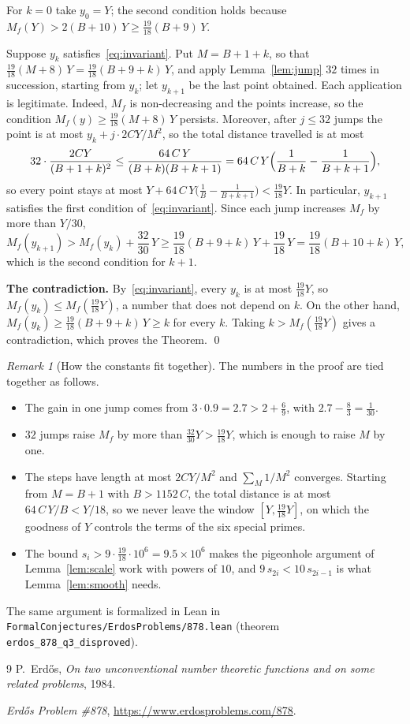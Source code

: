 \documentclass[11pt,a4paper]{amsart}
\theoremstyle{remark}
\newtheorem*{remark}{Remark}
\begin{document}
For $k = 0$ take $y_0 = Y$; the second condition holds because $M_f(Y) > 2(B + 10)\, Y \ge \frac{19}{18}(B + 9)\, Y$.

Suppose $y_k$ satisfies~\eqref{eq:invariant}. Put $M = B + 1 + k$, so that $\frac{19}{18}(M + 8)\, Y = \frac{19}{18}(B + 9 + k)\, Y$, and apply Lemma~\ref{lem:jump} $32$ times in succession, starting from $y_k$; let $y_{k+1}$ be the last point obtained. Each application is legitimate. Indeed, $M_f$ is non-decreasing and the points increase, so the condition $M_f(y) \ge \frac{19}{18}(M + 8)\, Y$ persists. Moreover, after $j \le 32$ jumps the point is at most $y_k + j \cdot 2CY/M^2$, so the total distance travelled is at most
\[
32 \cdot \frac{2 C Y}{(B + 1 + k)^2} \le \frac{64\, C\, Y}{(B + k)(B + k + 1)} = 64\, C\, Y \Bigl(\frac{1}{B + k} - \frac{1}{B + k + 1}\Bigr),
\]
so every point stays at most $Y + 64\, C\, Y \bigl(\frac{1}{B} - \frac{1}{B + k + 1}\bigr) < \frac{19}{18} Y$. In particular, $y_{k+1}$ satisfies the first condition of~\eqref{eq:invariant}. Since each jump increases $M_f$ by more than $Y/30$,
\[
M_f(y_{k + 1}) > M_f(y_k) + \frac{32}{30}\, Y \ge \frac{19}{18} (B + 9 + k)\, Y + \frac{19}{18}\, Y = \frac{19}{18} (B + 10 + k)\, Y,
\]
which is the second condition for $k + 1$.

\medskip
\noindent\textbf{The contradiction.} By~\eqref{eq:invariant}, every $y_k$ is at most $\frac{19}{18} Y$, so $M_f(y_k) \le M_f(\frac{19}{18} Y)$, a number that does not depend on $k$. On the other hand, $M_f(y_k) \ge \frac{19}{18}(B + 9 + k)\, Y \ge k$ for every $k$. Taking $k > M_f(\frac{19}{18} Y)$ gives a contradiction, which proves the Theorem. \qed

\begin{remark}[How the constants fit together]
The numbers in the proof are tied together as follows.
\begin{itemize}
\item The gain in one jump comes from $3 \cdot 0.9 = 2.7 > 2 + \frac{6}{9}$, with $2.7 - \frac{8}{3} = \frac{1}{30}$.
\item $32$ jumps raise $M_f$ by more than $\frac{32}{30} Y > \frac{19}{18} Y$, which is enough to raise $M$ by one.
\item The steps have length at most $2CY/M^2$ and $\sum_M 1/M^2$ converges. Starting from $M = B + 1$ with $B > 1152\, C$, the total distance is at most $64\, C\, Y / B < Y/18$, so we never leave the window $[Y, \frac{19}{18} Y]$, on which the goodness of $Y$ controls the terms of the six special primes.
\item The bound $s_i > 9 \cdot \frac{19}{18} \cdot 10^6 = 9.5 \times 10^6$ makes the pigeonhole argument of Lemma~\ref{lem:scale} work with powers of $10$, and $9\, s_{2i} < 10\, s_{2i-1}$ is what Lemma~\ref{lem:smooth} needs.
\end{itemize}
The same argument is formalized in Lean in \nolinkurl{FormalConjectures/ErdosProblems/878.lean} (theorem \texttt{erdos\_878\_q3\_disproved}).
\end{remark}

\begin{thebibliography}{9}
P.~Erd\H{o}s, \emph{On two unconventional number theoretic functions and on some related problems}, 1984.

\emph{Erd\H{o}s Problem \#878}, \url{https://www.erdosproblems.com/878}.
\end{thebibliography}
\end{document}
